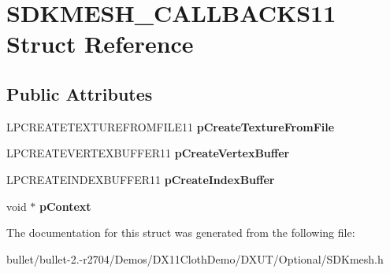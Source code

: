 \hypertarget{struct_s_d_k_m_e_s_h___c_a_l_l_b_a_c_k_s11}{\section{S\+D\+K\+M\+E\+S\+H\+\_\+\+C\+A\+L\+L\+B\+A\+C\+K\+S11 Struct Reference}
\label{struct_s_d_k_m_e_s_h___c_a_l_l_b_a_c_k_s11}
}
\subsection*{Public Attributes}
\begin{DoxyCompactItemize}
\item 
\hypertarget{struct_s_d_k_m_e_s_h___c_a_l_l_b_a_c_k_s11_af7bd0a879cc11d31e18899e6e0516917}{L\+P\+C\+R\+E\+A\+T\+E\+T\+E\+X\+T\+U\+R\+E\+F\+R\+O\+M\+F\+I\+L\+E11 {\bfseries p\+Create\+Texture\+From\+File}}\label{struct_s_d_k_m_e_s_h___c_a_l_l_b_a_c_k_s11_af7bd0a879cc11d31e18899e6e0516917}

\item 
\hypertarget{struct_s_d_k_m_e_s_h___c_a_l_l_b_a_c_k_s11_a56227cfe06f9f3d9d9d120edeeb0c9c4}{L\+P\+C\+R\+E\+A\+T\+E\+V\+E\+R\+T\+E\+X\+B\+U\+F\+F\+E\+R11 {\bfseries p\+Create\+Vertex\+Buffer}}\label{struct_s_d_k_m_e_s_h___c_a_l_l_b_a_c_k_s11_a56227cfe06f9f3d9d9d120edeeb0c9c4}

\item 
\hypertarget{struct_s_d_k_m_e_s_h___c_a_l_l_b_a_c_k_s11_a1f5abbf7cb0bfffa7b5e31a7a0fc3493}{L\+P\+C\+R\+E\+A\+T\+E\+I\+N\+D\+E\+X\+B\+U\+F\+F\+E\+R11 {\bfseries p\+Create\+Index\+Buffer}}\label{struct_s_d_k_m_e_s_h___c_a_l_l_b_a_c_k_s11_a1f5abbf7cb0bfffa7b5e31a7a0fc3493}

\item 
\hypertarget{struct_s_d_k_m_e_s_h___c_a_l_l_b_a_c_k_s11_a59ca12201beeb3b61cf178f5efede6ef}{void $\ast$ {\bfseries p\+Context}}\label{struct_s_d_k_m_e_s_h___c_a_l_l_b_a_c_k_s11_a59ca12201beeb3b61cf178f5efede6ef}

\end{DoxyCompactItemize}


The documentation for this struct was generated from the following file\+:\begin{DoxyCompactItemize}
\item 
bullet/bullet-\/2.-\/r2704/\+Demos/\+D\+X11\+Cloth\+Demo/\+D\+X\+U\+T/\+Optional/S\+D\+Kmesh.\+h\end{DoxyCompactItemize}
